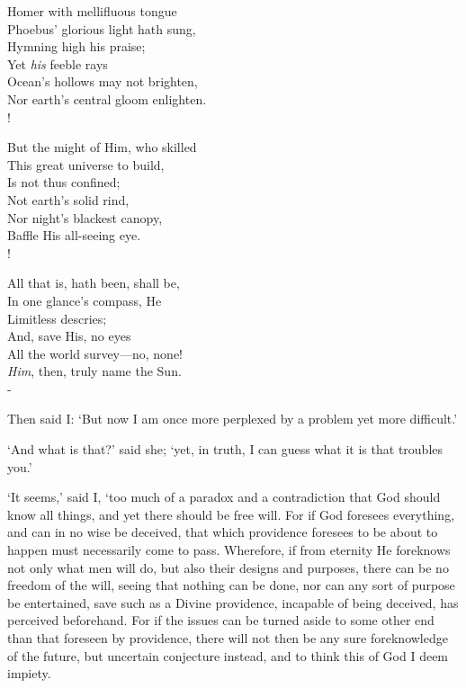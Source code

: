 \documentclass[12pt]{book}
\newenvironment{vpoem}[1]%
  {\def\poemvsindentlines{#1}\begin{poem}\small}%
  {\end{poem}\def\poemvsindentlines{\relax}}
\begin{document}
\begin{vpoem}{34}
    Homer with mellifluous tongue \\
    Phoebus' glorious light hath sung, \\
      Hymning high his praise; \\
      Yet \emph{his} feeble rays \\
    Ocean's hollows may not brighten, \\
    Nor earth's central gloom enlighten. \\!

    But the might of Him, who skilled \\
    This great universe to build, \\
      Is not thus confined; \\
      Not earth's solid rind, \\
    Nor night's blackest canopy, \\
    Baffle His all-seeing eye. \\!

    All that is, hath been, shall be, \\
    In one glance's compass, He \\
      Limitless descries; \\
      And, save His, no eyes \\
    All the world survey---no, none! \\
    \emph{Him}, then, truly name the Sun. \\-
\end{vpoem}


Then said I: `But now I am once more perplexed by a problem yet more
difficult.'

`And what is that?' said she; `yet, in truth, I can guess what it is
that troubles you.'

`It seems,' said I, `too much of a paradox and a contradiction that God
should know all things, and yet there should be free will. For if God
foresees everything, and can in no wise be deceived, that which
providence foresees to be about to happen must necessarily come to pass.
Wherefore, if from eternity He foreknows not only what men will do, but
also their designs and purposes, there can be no freedom of the will,
seeing that nothing can be done, nor can any sort of purpose be
entertained, save such as a Divine providence, incapable of being
deceived, has perceived beforehand. For if the issues can be turned
aside to some other end than that foreseen by providence, there will not
then be any sure foreknowledge of the future, but uncertain conjecture
instead, and to think this of God I deem impiety.
\end{document}
